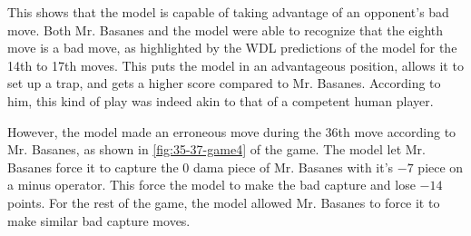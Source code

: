 This shows that the model is capable of taking advantage of an opponent's bad move. Both Mr. Basanes and the model were able to recognize that the eighth move is a bad move, as highlighted by the WDL predictions of the model for the 14th to 17th moves. This puts the model in an advantageous position, allows it to set up a trap, and gets a higher score compared to Mr. Basanes. According to him, this kind of play was indeed akin to that of a competent human player.

However, the model made an erroneous move during the 36th move according to Mr. Basanes, as shown in \ref{fig:35-37-game4} of the game. The model let Mr. Basanes force it to capture the 0 dama piece of Mr. Basanes with it's $-7$ piece on a minus operator. This force the model to make the bad capture and lose $-14$ points. For the rest of the game, the model allowed Mr. Basanes to force it to make similar bad capture moves.

